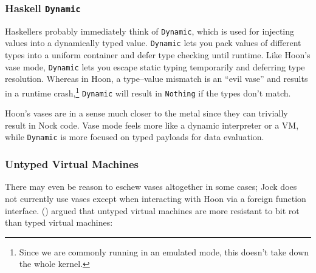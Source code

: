\documentclass[twoside]{article}
\begin{document}
\subsubsection{Haskell \texttt{Dynamic}}

Haskellers probably immediately think of \lstinline[style=inlinecode]{Dynamic}, which is used for injecting values into a dynamically typed value.  \lstinline[style=inlinecode]{Dynamic} lets you pack values of different types into a uniform container and defer type checking until runtime.  Like Hoon's vase mode, \lstinline[style=inlinecode]{Dynamic} lets you escape static typing temporarily and deferring type resolution.
Whereas in Hoon, a type–value mismatch is an “evil vase” and results in a runtime crash,\footnote{Since we are commonly running in an emulated mode, this doesn't take down the whole kernel.} \lstinline[style=inlinecode]{Dynamic} will result in \lstinline[style=inlinecode]{Nothing} if the types don't match.

Hoon's vases are in a sense much closer to the metal since they can trivially result in Nock code.  Vase mode feels more like a dynamic interpreter or a VM, while \lstinline[style=inlinecode]{Dynamic} is more focused on typed payloads for data evaluation.

\subsubsection{Untyped Virtual Machines}

There may even be reason to eschew vases altogether in some cases; Jock does not currently use vases except when interacting with Hoon via a foreign function interface.  \citeauthor{Chevalier2022} (\citeyear{Chevalier2022}) argued that untyped virtual machines are more resistant to bit rot than typed virtual machines:
\end{document}

